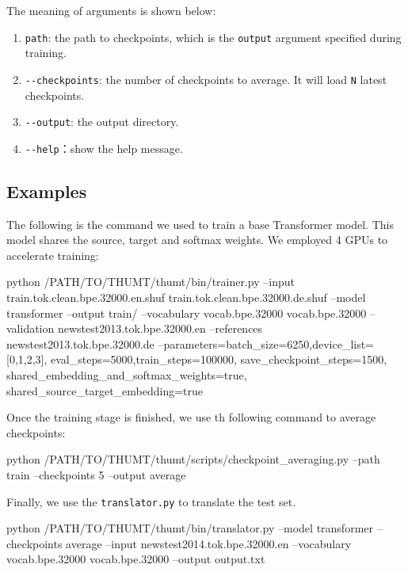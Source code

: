 \documentclass{article}
\begin{document}
The meaning of arguments is shown below:
\begin{enumerate}
\item \verb|path|: the path to checkpoints, which is the \verb|output| argument specified during training.
\item \verb|--checkpoints|: the number of checkpoints to average. It will load \verb|N| latest checkpoints.
\item \verb|--output|: the output directory.
\item \verb|--help|：show the help message.
\end{enumerate}


\subsection{Examples}
The following is the command we used to train a base Transformer model. This model shares the source, target and softmax weights. We employed 4 GPUs to accelerate training:
\begin{everbatim}
python /PATH/TO/THUMT/thumt/bin/trainer.py 
  --input train.tok.clean.bpe.32000.en.shuf 
          train.tok.clean.bpe.32000.de.shuf 
  --model transformer --output train/ 
  --vocabulary vocab.bpe.32000 vocab.bpe.32000 
  --validation newstest2013.tok.bpe.32000.en 
  --references newstest2013.tok.bpe.32000.de 
  --parameters=batch_size=6250,device_list=[0,1,2,3],
               eval_steps=5000,train_steps=100000,
               save_checkpoint_steps=1500,
               shared_embedding_and_softmax_weights=true,
               shared_source_target_embedding=true
\end{everbatim}

Once the training stage is finished, we use th following command to average checkpoints:
\begin{everbatim}
python /PATH/TO/THUMT/thumt/scripts/checkpoint_averaging.py
  --path train --checkpoints 5 --output average
\end{everbatim}

Finally, we use the \verb|translator.py| to translate the test set.
\begin{everbatim}
python /PATH/TO/THUMT/thumt/bin/translator.py 
  --model transformer 
  --checkpoints average 
  --input newstest2014.tok.bpe.32000.en 
  --vocabulary vocab.bpe.32000 vocab.bpe.32000 
  --output output.txt 
\end{everbatim}



\end{document}
